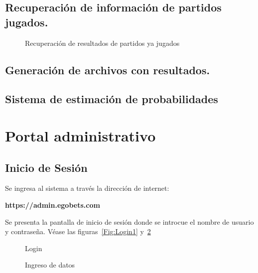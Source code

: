\subsection{Recuperación de información de partidos jugados.}

\begin{figure}[!htb]\centering
   \begin {minipage}{1\textwidth}
     \caption{Recuperación de resultados de partidos ya jugados}\label{Fig:pasados-partidos}
   \end{minipage}
\end{figure}

\subsection{Generación de archivos con resultados.}


\subsection{Sistema de estimación de probabilidades}
\section{Portal administrativo}
\graphicspath{{/Users/brunomedina/Dropbox/Tesis-Egobets/egobets-notas/resources/admin/}}

\subsection{Inicio de Sesión}
Se ingresa al sistema a través la dirección de internet: 
\begin{tightcenter}
	\textbf{https://admin.egobets.com}
\end{tightcenter}Se presenta la pantalla de inicio de sesión donde se introcue el nombre de usuario y contraseña. Véase las figuras~\ref{Fig:Login1} y~\ref{Fig:Login2}
\pagebreak
\begin{figure}[!htb]\centering
   \begin{minipage}{0.49\textwidth}
     \caption{Login}\label{Fig:Login1}
   \end{minipage}
   \begin {minipage}{0.49\textwidth}
     \caption{Ingreso de datos}\label{Fig:Login2}
   \end{minipage}
\end{figure}

